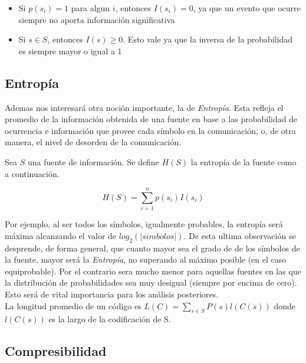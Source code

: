 \begin{itemize}
	\item Si $p(s_i) = 1$ para algun $i$, entonces $I(s_i) = 0$, ya que un evento que ocurre siempre no aporta información significativa
	\item Si $s \in S$, entonces $I(s) \geq 0$. Esto vale ya que la inversa de la probabilidad es siempre mayor o igual a 1
\end{itemize}

\subsection{Entropía}

Ademas nos interesará otra noción importante, la de \textit{Entropía}. 
Esta refleja el promedio de la información
obtenida de una fuente en base a las probabilidad de ocurrencia e información
que provee cada símbolo en la comunicación, o, de otra manera, el nivel de
desorden de la comunicación.  

\begin{definicion} \label{eq:entropia}
Sea $S$ una fuente de información. Se define $H(S)$ la entropía de la fuente como a continuación.

\begin{equation} 
	H(S) = \sum\limits_{i=1}^n p(s_i)I(s_i)
\end{equation}

\end{definicion}

Por ejemplo, al ser todos los símbolos, igualmente probables,
la entropía será máxima alcanzando el valor de $log_2(\lvert simbolos\rvert)$.
De esta ultima observación se desprende, de forma general, que cuanto mayor sea el grado de
 de los símbolos de la fuente, mayor será la
\textit{Entropía}, no superando al máximo posible (en el caso equiprobable).
Por el contrario sera mucho menor para aquellas fuentes en las
que la distribución de probabilidades sea muy desigual (siempre por encima de cero).
Esto será de vital importancia para los análisis posteriores.
\\

La longitud promedio de un código es $L(C) = \sum_{s \in S} P(s)l(C(s))$ donde
$l(C(s))$ es la largo de la codificación de S.
\\

\subsection{Compresibilidad}

